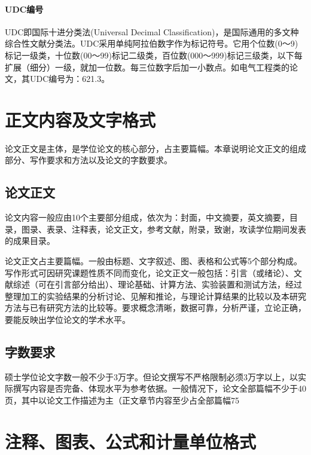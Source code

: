 \documentclass{cqupt_thesis}
\begin{document}
    \subsubsection{UDC编号}
    UDC即国际十进分类法(Universal Decimal Classification)，是国际通用的多文种综合性文献分类法。UDC采用单纯阿拉伯数字作为标记符号。它用个位数(0～9)标记一级类，十位数(00～99)标记二级类，百位数(000～999)标记三级类，以下每扩展（细分）一级，就加一位数。每三位数字后加一小数点。如电气工程类的论文，其UDC编号为：621.3。


    \chapter{正文内容及文字格式}
    论文正文是主体，是学位论文的核心部分，占主要篇幅。本章说明论文正文的组成部分、写作要求和方法以及论文的字数要求。


    \section{论文正文}
    论文内容一般应由10个主要部分组成，依次为：封面，中文摘要，英文摘要，目录，图录、表录、注释表，论文正文，参考文献，附录，致谢，攻读学位期间发表的成果目录。

    论文正文占主要篇幅。一般由标题、文字叙述、图、表格和公式等5个部分构成。写作形式可因研究课题性质不同而变化，论文正文一般包括：引言（或绪论）、文献综述（可在引言部分给出）、理论基础、计算方法、实验装置和测试方法，经过整理加工的实验结果的分析讨论、见解和推论，与理论计算结果的比较以及本研究方法与已有研究方法的比较等。要求概念清晰，数据可靠，分析严谨，立论正确，要能反映出学位论文的学术水平。


    \section{字数要求}
    硕士学位论文字数一般不少于3万字。但论文撰写不严格限制必须3万字以上，以实际撰写内容是否完备、体现水平为参考依据。一般情况下，论文全部篇幅不少于40页，其中以论文工作描述为主（正文章节内容至少占全部篇幅75%


    \chapter{注释、图表、公式和计量单位格式}
\end{document}

